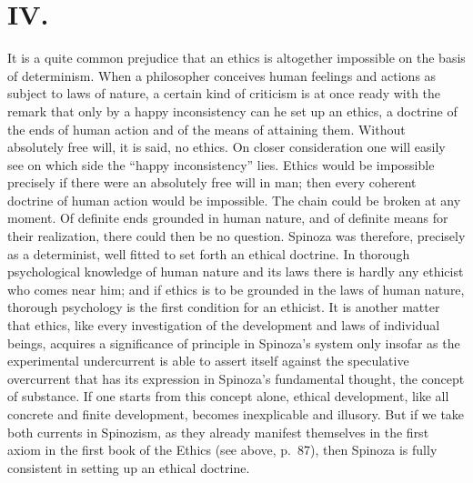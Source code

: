 \documentclass[12pt]{book}
\newcommand{\opage}[1]{\marginnote{\footnotesize\textit{[#1]}}}
\begin{document}
\section*{IV.}
\opage{120}It is a quite common prejudice that an ethics is altogether impossible on the
basis of determinism. When a philosopher conceives human feelings and actions as subject
to laws of nature, a certain kind of criticism is at once ready with the remark that only
by a happy inconsistency can he set up an ethics, a doctrine of the ends of human action
and of the means of attaining them. Without absolutely free will, it is said, no ethics.
On closer consideration one will easily see on which side the ``happy inconsistency''
lies. Ethics would be impossible precisely if there were an absolutely free will in man;
then every coherent doctrine of human action would be impossible. The chain could be
broken at any moment. Of definite ends grounded in human nature, and of definite means
for their realization, there could then be no question. Spinoza was therefore, precisely
as a determinist, well fitted to set forth an ethical doctrine. In thorough psychological
knowledge of human nature and its laws there is hardly any ethicist who comes near him;
and if ethics is to be grounded in the laws of human nature, thorough psychology is the
first condition for an ethicist. \opage{121}It is another matter that ethics, like every
investigation of the development and laws of individual beings, acquires a significance
of principle in Spinoza's system only insofar as the experimental undercurrent is able to
assert itself against the speculative overcurrent that has its expression in Spinoza's
fundamental thought, the concept of substance. If one starts from this concept alone,
ethical development, like all concrete and finite development, becomes inexplicable and
illusory. But if we take both currents in Spinozism, as they already manifest themselves
in the first axiom in the first book of the Ethics (see above, p.~87), then Spinoza is
fully consistent in setting up an ethical doctrine.
\end{document}
